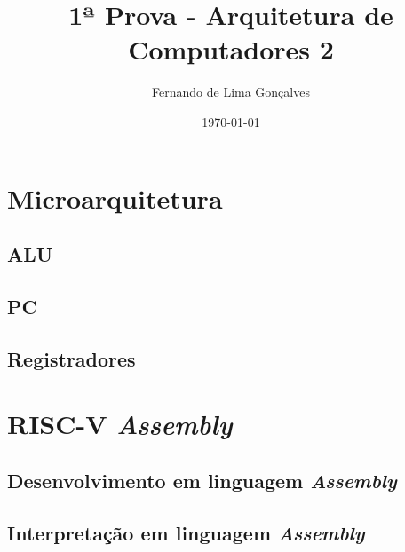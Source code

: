 \documentclass[12pt,titlepage,a4paper]{article}
\title{1ª Prova - Arquitetura de Computadores 2}
\author{Fernando de Lima Gonçalves}
\date{\today}
\begin{document}
\maketitle

\section{Microarquitetura}
\subsection{ALU}

\subsection{PC}

\subsection{Registradores}

\newpage\section{RISC-V \textit{Assembly}}
\subsection{Desenvolvimento em linguagem \textit{Assembly}}

\subsection{Interpretação em linguagem \textit{Assembly}}
\end{document}

